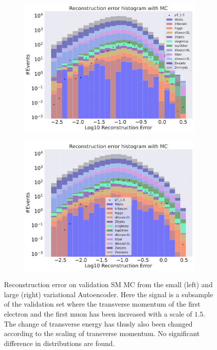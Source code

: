 \begin{figure}[H]
    \centering
    \begin{subfigure}{.45\textwidth}
        \includegraphics[width=\textwidth]{Figures/VAE_testing/small/b_data_recon_big_rm3_feats_sig_pT_1.5.pdf}
        \caption{}
        \label{fig:VAE_small_pt_1_5}
    \end{subfigure}
    \hfill 
    \begin{subfigure}{.45\textwidth}
        \includegraphics[width=\textwidth]{Figures/VAE_testing/big/b_data_recon_big_rm3_feats_sig_pT_1.5.pdf}
        \caption{ }
        \label{fig:VAE_big_pt_1_5}
    \end{subfigure}
    \hfill 
    \caption[VAE |Reconstruction error $p_T$ altering of 1.5]{Reconstruction error on validation SM MC from the small (left) and large (right) variational Autoencoder. Here the signal is a subsample of the validation 
    set where the transverse momentum of the first electron and the first muon has been increased with a scale of $1.5$. The change of transverse 
    energy has thusly also been changed according to the scaling of transverse momentum. No significant difference in distributions are found. }
    \label{fig:VAE_big_small_pt_1_5}
\end{figure}

